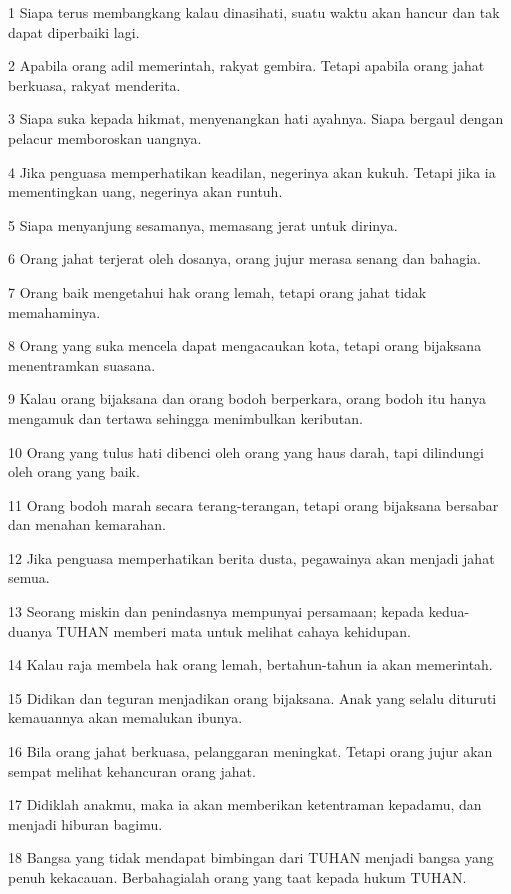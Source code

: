 \par 1 Siapa terus membangkang kalau dinasihati, suatu waktu akan hancur dan tak dapat diperbaiki lagi.
\par 2 Apabila orang adil memerintah, rakyat gembira. Tetapi apabila orang jahat berkuasa, rakyat menderita.
\par 3 Siapa suka kepada hikmat, menyenangkan hati ayahnya. Siapa bergaul dengan pelacur memboroskan uangnya.
\par 4 Jika penguasa memperhatikan keadilan, negerinya akan kukuh. Tetapi jika ia mementingkan uang, negerinya akan runtuh.
\par 5 Siapa menyanjung sesamanya, memasang jerat untuk dirinya.
\par 6 Orang jahat terjerat oleh dosanya, orang jujur merasa senang dan bahagia.
\par 7 Orang baik mengetahui hak orang lemah, tetapi orang jahat tidak memahaminya.
\par 8 Orang yang suka mencela dapat mengacaukan kota, tetapi orang bijaksana menentramkan suasana.
\par 9 Kalau orang bijaksana dan orang bodoh berperkara, orang bodoh itu hanya mengamuk dan tertawa sehingga menimbulkan keributan.
\par 10 Orang yang tulus hati dibenci oleh orang yang haus darah, tapi dilindungi oleh orang yang baik.
\par 11 Orang bodoh marah secara terang-terangan, tetapi orang bijaksana bersabar dan menahan kemarahan.
\par 12 Jika penguasa memperhatikan berita dusta, pegawainya akan menjadi jahat semua.
\par 13 Seorang miskin dan penindasnya mempunyai persamaan; kepada kedua-duanya TUHAN memberi mata untuk melihat cahaya kehidupan.
\par 14 Kalau raja membela hak orang lemah, bertahun-tahun ia akan memerintah.
\par 15 Didikan dan teguran menjadikan orang bijaksana. Anak yang selalu dituruti kemauannya akan memalukan ibunya.
\par 16 Bila orang jahat berkuasa, pelanggaran meningkat. Tetapi orang jujur akan sempat melihat kehancuran orang jahat.
\par 17 Didiklah anakmu, maka ia akan memberikan ketentraman kepadamu, dan menjadi hiburan bagimu.
\par 18 Bangsa yang tidak mendapat bimbingan dari TUHAN menjadi bangsa yang penuh kekacauan. Berbahagialah orang yang taat kepada hukum TUHAN.
